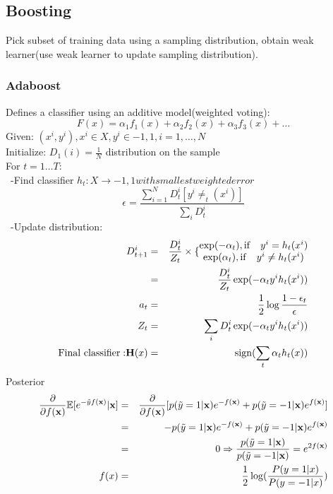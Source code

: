 \documentclass[12pt,a4paper]{article}
\begin{document}
\subsection*{Boosting}
Pick subset of training data using a sampling distribution, obtain weak learner(use weak learner to update sampling distribution).\\
\subsubsection*{Adaboost}
Defines a classifier using an additive model(weighted voting):
$$
F(x) = \alpha_1f_1(x)+\alpha_2f_2(x)+\alpha_3f_3(x)+\ldots
$$
Given: $(x^i,y^i),x^i\in X, y^i\in{-1,1},i=1,\ldots,N$\\
Initialize: $D_1(i)=\frac{1}{N}$ distribution on the sample\\
For $t=1\ldots T$:\\
\ -Find classifier $h_t:X\rightarrow {-1,1} with smallest weighted error$\\
$$
\epsilon = \frac{\sum_{i=1}^{N}D_t^i[y^i\neq_t(x^i)]}{\sum_{i}{D_t^i}}
$$
\ -Update distribution: 
\begin{eqnarray*}
D_{t+1}^i &=& \frac{D_t^i}{Z_t}\times \{\begin{matrix}
\exp(-\alpha_t), {\rm if} \quad y^i = h_t(x^i)\\
\exp(\alpha_t), {\rm if} \quad y^i \neq h_t(x^i)
\end{matrix} \\
 &=& \frac{D_t^i}{Z_t}\exp(-\alpha_ty^ih_t(x^i)) \\
a_t &=& \frac{1}{2}\log\frac{1-\epsilon_t}{\epsilon}\\
Z_t &=& \sum_i D^i_t\exp(-\alpha_ty^ih_t(x^i))\\
{\rm Final\  classifier :} {\bf H}(x) &=&{\rm sign}(\sum_{t}\alpha_th_t(x)) 
\end{eqnarray*}
\large{Posterior}
\begin{eqnarray*}
\frac{\partial}{\partial f({\bf x})} \mathbb{E}[e^{-\tilde{y}f({\bf x})}|{\bf x}]&=& \frac{\partial}{\partial f({\bf x})}[p(\tilde{y}=1|{\bf x})e^{-f({\bf x})}+p(\tilde y=-1|{\bf x})e^{f({\bf x})}] \\
&=& -p(\tilde{y}=1|{\bf x})e^{-f({\bf x})}+p(\tilde{y}=-1|{\bf x})e^{f({\bf x})} \\
&=& 0 \Rightarrow \frac{p(\tilde{y}=1|{\bf x})}{p(\tilde{y}=-1|{\bf x})} =e^{2f({\bf x})}\\
f(x) &=& \frac{1}{2}\log(\frac{P(y=1|x)}{P(y=-1|x)})\\
\end{eqnarray*}
\end{document}
